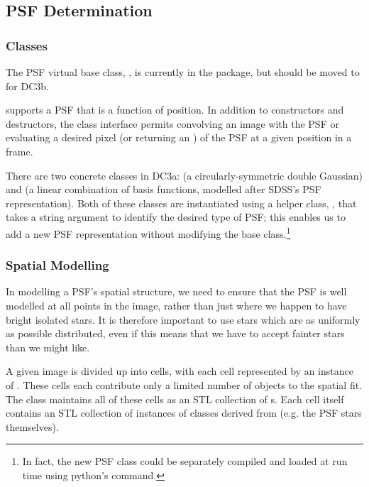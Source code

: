 
\subsection{PSF Determination}
\label{secPsf}

\subsubsection{Classes}

The PSF virtual base class, , is currently in the
 package, but should be moved
to  for DC3b.

 supports a PSF that is a function of position.  
In addition to constructors and destructors, the class interface
permits convolving an image with the PSF or evaluating a desired
pixel (or returning an ) of the PSF at a given position in a frame.

There are two concrete  classes in DC3a:  (a circularly-symmetric double Gaussian) and
 (a linear combination of basis functions, modelled after SDSS's PSF representation).  Both of these
classes are instantiated using a helper class, , that takes a string argument to identify the desired
type of PSF; this enables us to add a new PSF representation without modifying the base class.\footnote{In fact, the new
  PSF class could be separately compiled and loaded at run time using python's  command.}

\subsubsection{Spatial Modelling}

In modelling a PSF's spatial structure, we need to ensure that the PSF is well modelled at all
points in the image, rather than just where we happen to have bright isolated stars.  It is
therefore important to use stars which are as uniformly as possible distributed, even if this
means that we have to accept fainter stars than we might like.

A given image is divided up into cells, with each cell represented by an instance of . These cells
each contribute only a limited number of objects to the spatial fit.  The  class maintains all of
these cells as an STL collection of s.  Each cell itself contains an STL collection of instances of
classes derived from  (e.g. the PSF stars themselves).

